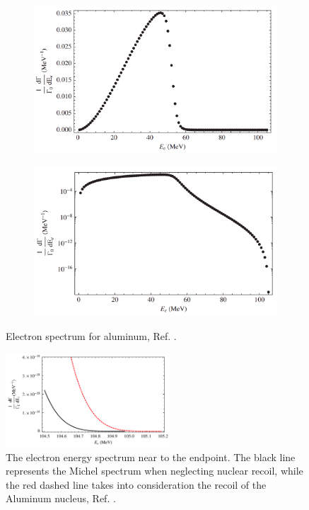 \begin{figure}[!h]
     \begin{subfigure}[b]{0.4\linewidth}
         \centering
         \includegraphics[scale = 0.18]{images/chapter2/Screenshot_20240222_175415.png}
         \label{fig:linearscalemichel}
     \end{subfigure}
     \begin{subfigure}[b]{0.7\linewidth}
         \centering
         \includegraphics[scale = 0.18]{images/chapter2/Screenshot_20240222_175446.png}
         \label{fig:logscalemichel}
     \end{subfigure}
     \caption{Electron spectrum for aluminum, Ref. \cite{PhysRevD.84.013006}.}
        \label{fig:michel}
\end{figure}

\begin{figure}[!h]
\centering
\includegraphics[width =0.55\textwidth]{images/chapter2/Screenshot_20240222_175644.png}
\caption{The electron energy spectrum near to the endpoint. The black line represents the Michel spectrum when neglecting nuclear recoil, while the red dashed line takes into consideration the recoil of the Aluminum nucleus, Ref. \cite{PhysRevD.84.013006}.}
\label{fig:micheldiff}
\end{figure}

